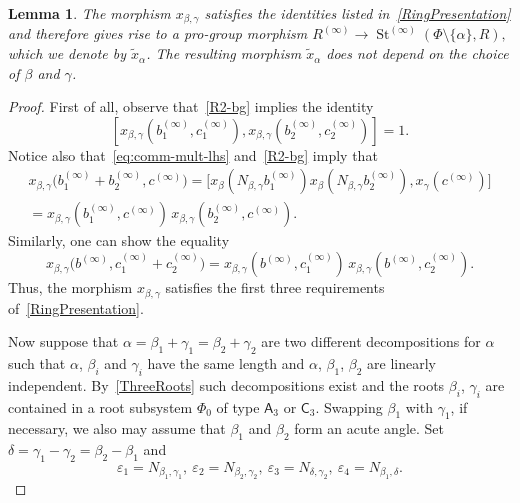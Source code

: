 \documentclass[oneside, 11pt]{amsart}
\numberwithin{equation}{section}
\newtheorem{lemma}{Lemma} \numberwithin{lemma}{section}
\theoremstyle{definition}
\theoremstyle{remark}
\DeclareMathOperator\St{St}
\newcommand{\rA}{\mathsf{A}}
\newcommand{\rC}{\mathsf{C}}
\begin{document}
\begin{lemma}\label{lem:new-root}
 The morphism $x_{\beta, \gamma}$ satisfies the identities listed in~\cref{RingPresentation} and therefore gives rise to a pro-group morphism $R^{(\infty)} \to \St^{(\infty)}(\Phi\setminus\{\alpha\}, R),$ which we denote by $\widetilde{x}_\alpha$. The resulting morphism $\widetilde{x}_\alpha$ does not depend on the choice of $\beta$ and $\gamma$.
\end{lemma}
\begin{proof}
 First of all, observe that~\eqref{R2-bg} implies the identity \[[x_{\beta, \gamma}(b_1^{(\infty)}, c_1^{(\infty)}),
 x_{\beta, \gamma}(b_2^{(\infty)}, c_2^{(\infty)})] = 1.\] 
 Notice also that~\eqref{eq:comm-mult-lhs} and~\eqref{R2-bg} imply that
 \begin{align*}
 x_{\beta, \gamma}\bigl(b_1^{(\infty)} + b_2^{(\infty)}, c^{(\infty)}\bigr)
 = \bigl[x_\beta(N_{\beta, \gamma} b_1^{(\infty)})
 x_\beta(N_{\beta, \gamma} b_2^{(\infty)}),
 x_\gamma(c^{(\infty)})\bigr]\\
 = x_{\beta, \gamma}(b_1^{(\infty)}, c^{(\infty)})\,
 x_{\beta, \gamma}(b_2^{(\infty)}, c^{(\infty)}).
 \end{align*}
 Similarly, one can show the equality
 \[x_{\beta, \gamma}\bigl(b^{(\infty)}, c_1^{(\infty)} + c_2^{(\infty)}\bigr)
 = x_{\beta, \gamma}(b^{(\infty)}, c_1^{(\infty)})\,
 x_{\beta, \gamma}(b^{(\infty)}, c_2^{(\infty)}).\]
 Thus, the morphism \(x_{\beta, \gamma}\) satisfies the first three requirements of~\cref{RingPresentation}. 
 
 Now suppose that \(\alpha = \beta_1 + \gamma_1 = \beta_2 + \gamma_2\) are two different decompositions for $\alpha$ such that $\alpha$, $\beta_i$ and $\gamma_i$ have the same length and \(\alpha\), \(\beta_1\), \(\beta_2\) are linearly independent. By~\cref{ThreeRoots} such decompositions exist and the roots $\beta_i$, $\gamma_i$ are contained in a root subsystem $\Phi_0$ of type \(\rA_3\) or \(\rC_3\). Swapping $\beta_1$ with $\gamma_1$, if necessary, we also may assume that $\beta_1$ and $\beta_2$ form an acute angle. Set $\delta = \gamma_1 - \gamma_2 = \beta_2 - \beta_1$ and \[\varepsilon_1 = N_{\beta_1, \gamma_1},\ \varepsilon_2 = N_{\beta_2, \gamma_2},\ \varepsilon_3 = N_{\delta,\gamma_2},\ \varepsilon_4 = N_{\beta_1, \delta}.\]
 

\end{proof}
\end{document}
